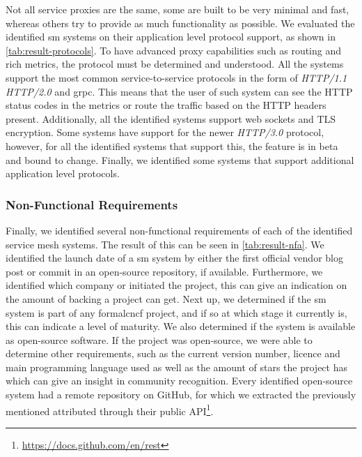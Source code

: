 Not all service proxies are the same, some are built to be very minimal and fast, whereas others try to provide as much functionality as possible. We evaluated the identified \gls{sm} systems on their application level protocol support, as shown in \cref{tab:result-protocols}. To have advanced proxy capabilities such as routing and rich metrics, the protocol must be determined and understood. All the systems support the most common service-to-service protocols in the form of \textit{HTTP/1.1} \textit{HTTP/2.0} and \gls{grpc}. This means that the user of such system can see the HTTP status codes in the metrics or route the traffic based on the HTTP headers present. Additionally, all the identified systems support web sockets and TLS encryption. Some systems have support for the newer \textit{HTTP/3.0} protocol, however, for all the identified systems that support this, the feature is in beta and bound to change. Finally, we identified some systems that support additional application level protocols. 



\subsubsection{Non-Functional Requirements}
\label{sec:survey:results:comparison:nfr}



Finally, we identified several non-functional requirements of each of the identified service mesh systems. The result of this can be seen in \cref{tab:result-nfa}. We identified the launch date of a \gls{sm} system by either the first official vendor blog post or commit in an open-source repository, if available. Furthermore, we identified which company or initiated the project, this can give an indication on the amount of backing a project can get. Next up, we determined if the \gls{sm} system is part of any formal\gls{cncf} project, and if so at which stage it currently is, this can indicate a level of maturity. We also determined if the system is available as open-source software. If the project was open-source, we were able to determine other requirements, such as the current version number, licence and main programming language used as well as the amount of stars the project has which can give an insight in community recognition. Every identified open-source system had a remote repository on GitHub, for which we extracted the previously mentioned attributed through their public API\footnote{\url{https://docs.github.com/en/rest}}.
